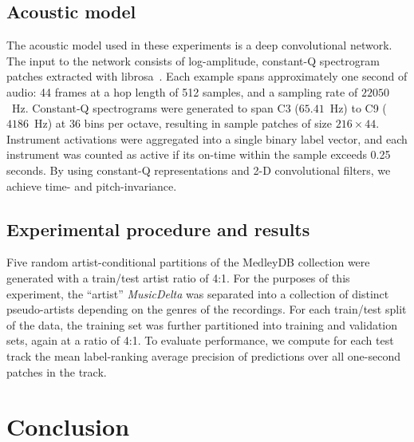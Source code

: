 \documentclass{article}
\begin{document}
\subsection{Acoustic model}

%
%

The acoustic model used in these experiments is a deep convolutional network.
The input to the network consists of log-amplitude, constant-Q spectrogram patches
extracted with librosa~\cite{librosa}.
Each example spans approximately one second of audio: 44 frames at a hop length of 512 
samples, and a sampling rate of $22050$~Hz. 
Constant-Q spectrograms were generated to span C3 ($65.41$~Hz) to C9 ($4186$~Hz) at 36
bins per octave, resulting in sample patches of size $216\times44$.  Instrument activations were aggregated into a single binary label
vector, and each instrument was counted as active if its on-time within the sample
exceeds 0.25 seconds.
By using constant-Q representations and 2-D convolutional filters, we achieve time- and
pitch-invariance.


\subsection{Experimental procedure and results}

Five random artist-conditional partitions of the MedleyDB collection were generated with
a train/test artist ratio of 4:1.  For the purposes of this experiment, 
the ``artist'' \emph{MusicDelta} was separated into a collection of distinct pseudo-artists 
depending on the genres of the recordings.
For each train/test split of the data, the training set was further partitioned into
training and validation sets, again at a ratio of 4:1.
To evaluate performance, we compute for each test track the mean label-ranking average
precision of predictions over all one-second patches in the track.  

\section{Conclusion}


\end{document}
